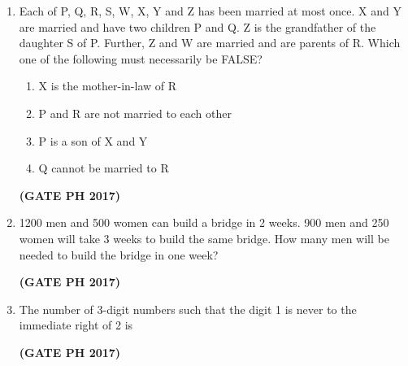 \documentclass[14pt, a4paper]{extarticle}
\begin{document}
\begin{enumerate}[label=\textbf{Q.\arabic*}]
\item Each of P, Q, R, S, W, X, Y and Z has been married at most once. X and Y are married and have two children P and Q. Z is the grandfather of the daughter S of P. Further, Z and W are married and are parents of R. Which one of the following must necessarily be FALSE?
\begin{enumerate}
\item X is the mother-in-law of R
\item P and R are not married to each other
\item P is a son of X and Y
\item Q cannot be married to R
\end{enumerate}
\hfill \textbf{(GATE PH 2017)}

\item 1200 men and 500 women can build a bridge in 2 weeks. 900 men and 250 women will take 3 weeks to build the same bridge. How many men will be needed to build the bridge in one week?
\begin{enumerate}
\end{enumerate}
\hfill \textbf{(GATE PH 2017)}

\item The number of 3-digit numbers such that the digit 1 is never to the immediate right of 2 is
\begin{enumerate}
\end{enumerate}
\hfill \textbf{(GATE PH 2017)}


\end{enumerate}
\end{document}
